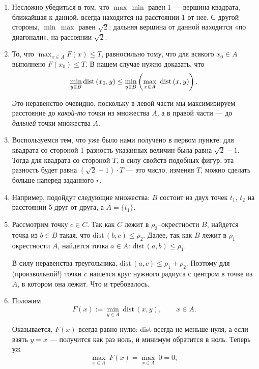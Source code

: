 ﻿
\def\dist{\mathrm{dist}\,} \def\l#1{\limits_{#1}}
\def\Dist{\mathrm{DIST}\,}

\begin{enumerate}

\item Несложно убедиться в том, что $\max\,\min$ равен 1 — вершина квадрата, ближайшая к данной, всегда находится на расстоянии 1 от нее. С другой стороны, $\min\,\max$ равен $\sqrt{2}$: дальняя вершина от данной находится «по диагонали», на рассоянии $\sqrt{2}$.

\item То, что $\max_{x \in A} F(x) \le T$, равносильно тому, что для всякого $x_0 \in A$ выполнено $F(x_0) \le T$. В нашем случае нужно доказать, что
$$\min\l{y \in B} \dist(x_0,y) \le \min\l{y \in B}
	\ll \max\l{x \in A}\ \dist (x,y) \rr.$$

Это неравенство очевидно, поскольку в левой части мы максимизируем расстояние до {\itshape какой-то} точки из множества $A$, а в правой части — до {\itshape дальней} точки множества $A$.

\item Воспользуемся тем, что уже было нами получено в первом пункте: для квадрата со стороной 1 разность указанных величин была равна $\sqrt 2 -1$. Тогда для квадрата со стороной $T$, в силу свойств подобных фигур, эта разность будет равна $(\sqrt 2 -1) \cdot T$ — это число, изменяя $T$, можно сделать больше наперед заданного $r$.

\item Например, подойдут следующие множества: $B$ состоит из двух точек $t_1$, $t_2$ на расстоянии 5 друг от друга, а $A = \{ t_1 \}$.

\item Рассмотрим точку $c \in C$. Так как $C$ лежит в $\rho_2$–окрестности $B$, найдется точка из $b \in B$ такая, что $\dist (b,c) \le \rho_2$. Далее, так как $B$ \linebreak  лежит в $\rho_1$--окрестности $A$, найдется точка $a \in A$: $\dist (a,b) \le \rho_1$.

В силу неравенства треугольника, $\dist (a,c) \le \rho_1 + \rho_2$. Поэтому для (произвольной!) точки $c$ нашелся круг нужного радиуса с центром в точке из $A$, в котором она лежит. Что и требовалось.

\item Положим
$$F(x) := \min\l{y \in A}\ \dist (x,y), \qquad x \in A.$$

Оказывается, $F(x)$ всегда равно нулю: dist всегда не меньше нуля, а если взять $y=x$ — получится как раз ноль, и минимум обратится в ноль. Теперь уж
$$\max\l{x\in A}\ F(x) = \max\l{x \in A}\ 0 = 0,$$


\end{enumerate}
